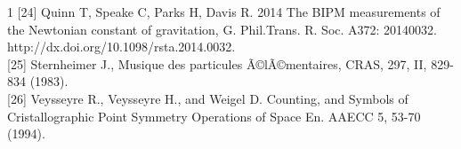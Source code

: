 \documentclass[a4paper,9pt]{article}
\begin{document}
\begin{thebibliography}{1}
[24] Quinn T, Speake C, Parks H, Davis R. 2014 The BIPM measurements of the Newtonian constant of gravitation, G. Phil.Trans. R. Soc. A372: 20140032. http://dx.doi.org/10.1098/rsta.2014.0032. \\

[25]  Sternheimer J., Musique des particules Ã©lÃ©mentaires, CRAS, 297, II, 829-834 (1983).\\

[26] Veysseyre R., Veysseyre H., and Weigel D. Counting, and Symbols of Cristallographic Point Symmetry Operations of Space En. AAECC 5, 53-70 (1994).\\


\end{thebibliography}
\end{document}
